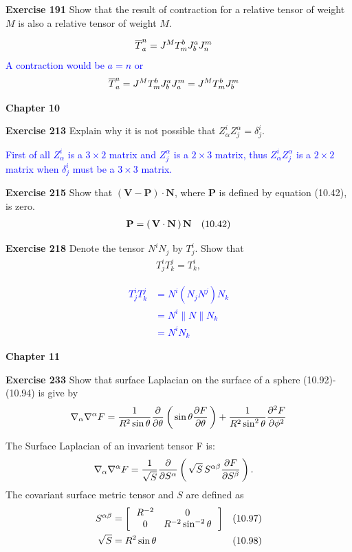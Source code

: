 \documentclass[12pt,a4paper]{report}
\newcommand{\BLUE}[1]{\textcolor{blue}{#1}}
\begin{document}
\textbf{Exercise 191} Show that the result of contraction for a relative tensor of weight $M$ is also a relative tensor of weight $M$.

\BLUE{\begin{align*}
	\overline{T}	_a^n &= J^MT_m^bJ_b^aJ_n^m
\end{align*}A contraction would be $a=n$ or
\begin{align*}
	\overline{T}	_a^a &= J^MT_m^bJ_b^aJ_a^m = J^MT_m^bJ_b^m
\end{align*}
}

\HLINE

\textbf{Chapter 10}

\textbf{Exercise 213} Explain why it is not possible that $Z_\alpha^i Z_j^\alpha = \delta_j^i$.

\BLUE{First of all $Z_\alpha^i$ is a $3\times 2$ matrix and $Z_j^\alpha$ is a $2\times 3$ matrix, thus $Z_\alpha^i Z_j^\alpha$ is a $2 \times 2$ matrix when $\delta_j^i$ must be a $3 \times 3$ matrix.
}

\textbf{Exercise 215} Show that $(\textbf{V}-\textbf{P})\cdot\textbf{N}$, where $\textbf{P}$ is defined by equation (10.42), is zero.
\begin{align*}
	\textbf{P} &= \left (\, \textbf{V}\cdot\textbf{N} \,\right )\textbf{N} & (10.42)
\end{align*}

\textbf{Exercise 218} Denote the tensor $N^iN_j$ by $T_j^i$. Show that 
\begin{align*}
	T_j^iT_k^j=T_k^i,
\end{align*}

\BLUE{
\begin{align*}
		T_j^iT_k^j &= N^i(N_jN^j)N_k \\
		&= N^i\|N\|N_k \\
		&= N^iN_k
\end{align*}
}

\HLINE

\textbf{Chapter 11}

\textbf{Exercise 233} Show that surface Laplacian on the surface of a sphere (10.92)-(10.94) is give by 
\begin{align*}
	\nabla_\alpha\nabla^\alpha F = \frac{1}{R^2\sin\theta}\frac{\partial }{\partial \theta}\left (\, \sin\theta\frac{\partial F}{\partial \theta} \,\right )+\frac{1}{R^2\sin^2\theta}\frac{\partial^2 F}{\partial \phi^2}
\end{align*}

The Surface Laplacian of an invarient tensor F is:
\begin{align*}
	\nabla_\alpha\nabla^\alpha F &= \frac{1}{\sqrt{S}}\frac{\partial }{\partial S^\alpha}\left (\, \sqrt{S}\,S^{\alpha\beta}\frac{\partial F}{\partial S^\beta} \,\right ).
\end{align*}The covariant surface metric tensor and $S$ are defined as 
\begin{align*}
	S^{\alpha\beta} &= \left [\,  \begin{array}{c c} R^{-2}&0 \\ 0 & R^{-2}\sin^{-2}\theta \end{array}  \,\right ] & (10.97) \\
	\sqrt{S} &= R^2\sin\theta & (10.98)
\end{align*}
\end{document}
